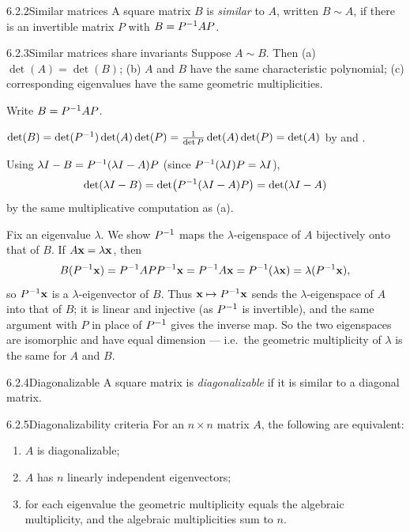 \begin{defns}{6.2.2}{Similar matrices}
A square matrix $B$ is \emph{similar} to $A$, written $B\sim A$, if there is an invertible matrix $P$ with $B=P^{-1} AP$.
\end{defns}

\begin{thms}{6.2.3}{Similar matrices share invariants}
Suppose $A\sim B$. Then
\textup{(a)} $\det(A)=\det(B)$;
\textup{(b)} $A$ and $B$ have the same characteristic polynomial;
\textup{(c)} corresponding eigenvalues have the same geometric multiplicities.
\end{thms}

\begin{prf}
Write $B=P^{-1} AP$.

 $\det(B)=\det(P^{-1})\det(A)\det(P)=\tfrac{1}{\det P}\det(A)\det(P)=\det(A)$ by  and .

 Using $\lambda I-B=P^{-1}(\lambda I-A)P$ (since $P^{-1}(\lambda I)P=\lambda I$),
\[
\det(\lambda I-B)=\det\bigl(P^{-1}(\lambda I-A)P\bigr)=\det(\lambda I-A)
\]
by the same multiplicative computation as (a).

 Fix an eigenvalue $\lambda$. We show $P^{-1}$ maps the $\lambda$-eigenspace of $A$ bijectively onto that of $B$. If $A\mathbf{x}=\lambda\mathbf{x}$, then
\[
B(P^{-1}\mathbf{x})=P^{-1} AP P^{-1}\mathbf{x}=P^{-1} A\mathbf{x}=P^{-1}(\lambda\mathbf{x})=\lambda(P^{-1}\mathbf{x}),
\]
so $P^{-1}\mathbf{x}$ is a $\lambda$-eigenvector of $B$. Thus $\mathbf{x}\mapsto P^{-1}\mathbf{x}$ sends the $\lambda$-eigenspace of $A$ into that of $B$; it is linear and injective (as $P^{-1}$ is invertible), and the same argument with $P$ in place of $P^{-1}$ gives the inverse map. So the two eigenspaces are isomorphic and have equal dimension --- i.e.\ the geometric multiplicity of $\lambda$ is the same for $A$ and $B$.
\end{prf}

\begin{defns}{6.2.4}{Diagonalizable}
A square matrix is \emph{diagonalizable} if it is similar to a diagonal matrix.
\end{defns}

\begin{thms}{6.2.5}{Diagonalizability criteria}
For an $n\times n$ matrix $A$, the following are equivalent:
\begin{enumerate}[label=\textup{(\alph*)},leftmargin=2.2em,itemsep=1pt]
\item $A$ is diagonalizable;
\item $A$ has $n$ linearly independent eigenvectors;
\item for each eigenvalue the geometric multiplicity equals the algebraic multiplicity, and the algebraic multiplicities sum to $n$.
\end{enumerate}
\end{thms}

